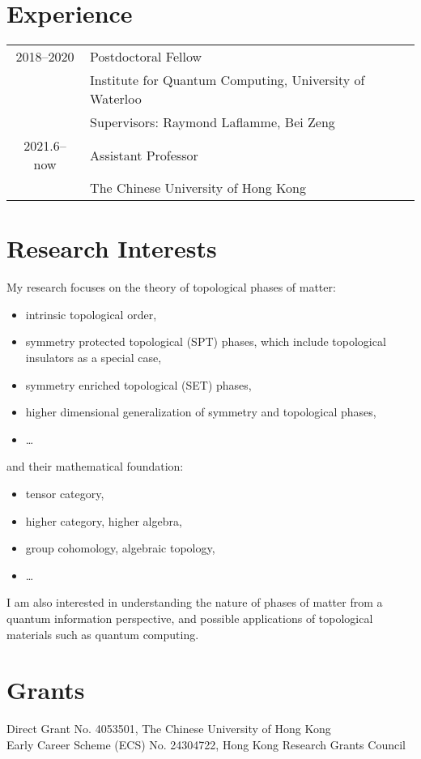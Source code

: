 \documentclass[hidelinks,a4paper]{article}
\begin{document}
\section*{Experience}
\def\arraystretch{1.}
\begin{tabular}{cl}
  { 2018--2020} & Postdoctoral Fellow\\ 
  &Institute for Quantum Computing, University of Waterloo\\
  &Supervisors: Raymond Laflamme, Bei Zeng\\
  {2021.6--now} &Assistant Professor\\
  &The Chinese University of Hong Kong
\end{tabular}

\section*{Research Interests}
My research focuses on the theory of topological phases of matter:
\begin{itemize}
  \item  intrinsic topological order,
  \item  symmetry protected topological (SPT) phases, which include topological
    insulators as a special case,
  \item  symmetry enriched topological (SET) phases,
  \item  higher dimensional generalization of symmetry and topological phases,
  \item \ldots
\end{itemize}
and their mathematical foundation:
\begin{itemize}
  \item tensor category,
  \item higher category, higher algebra,
  \item group cohomology, algebraic topology,
  \item \ldots
\end{itemize}
I am also interested in understanding the nature of phases of matter from a
quantum information perspective, and possible applications of topological
materials such as quantum computing.

\section*{Grants}
Direct Grant No. 4053501, The Chinese University of Hong Kong\\
Early Career Scheme (ECS) No. 24304722, Hong Kong Research Grants Council
\end{document}

